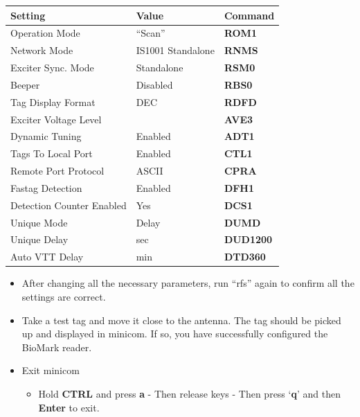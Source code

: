 \documentclass[
  letterpaper,
]{scrbook}
\providecommand{\tightlist}{%
  \setlength{\itemsep}{0pt}\setlength{\parskip}{0pt}}
\begin{document}
\begin{longtable}[]{@{}
  >{\raggedright\arraybackslash}p{}
  >{\raggedright\arraybackslash}p{}
  >{\raggedright\arraybackslash}p{}@{}}
\toprule\noalign{}
\begin{minipage}[b]{\linewidth}\raggedright
Setting
\end{minipage} & \begin{minipage}[b]{\linewidth}\raggedright
Value
\end{minipage} & \begin{minipage}[b]{\linewidth}\raggedright
Command
\end{minipage} \\
\midrule\noalign{}
\endhead
\bottomrule\noalign{}
\endlastfoot
Operation Mode & ``Scan'' & \textbf{ROM1} \\
Network Mode & IS1001 Standalone & \textbf{RNMS} \\
Exciter Sync. Mode & Standalone & \textbf{RSM0} \\
Beeper & Disabled & \textbf{RBS0} \\
Tag Display Format & DEC & \textbf{RDFD} \\
Exciter Voltage Level & 3 & \textbf{AVE3} \\
Dynamic Tuning & Enabled & \textbf{ADT1} \\
Tags To Local Port & Enabled & \textbf{CTL1} \\
Remote Port Protocol & ASCII & \textbf{CPRA} \\
Fastag Detection & Enabled & \textbf{DFH1} \\
Detection Counter Enabled & Yes & \textbf{DCS1} \\
Unique Mode & Delay & \textbf{DUMD} \\
Unique Delay & 1200 sec & \textbf{DUD1200} \\
Auto VTT Delay & 360 min & \textbf{DTD360} \\
\end{longtable}

\begin{itemize}
\item
  After changing all the necessary parameters, run ``rfs'' again to
  confirm all the settings are correct.
\item
  Take a test tag and move it close to the antenna. The tag should be
  picked up and displayed in minicom. If so, you have successfully
  configured the BioMark reader.
\item
  Exit minicom

  \begin{itemize}
  \tightlist
  \item
    Hold \textbf{CTRL} and press \textbf{a} - Then release keys - Then
    press `\textbf{q}' and then \textbf{Enter} to exit.
  \end{itemize}
\end{itemize}
\end{document}
